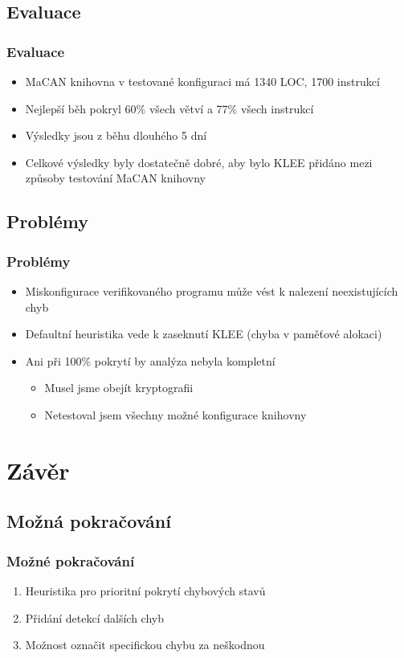 \documentclass{beamer}
\begin{document}
\subsection*{Evaluace}
\begin{frame}
\frametitle{Evaluace}
\begin{itemize}
    \item MaCAN knihovna v testované konfiguraci má 1340 LOC, 1700 instrukcí
    \item Nejlepší běh pokryl 60\% všech větví a 77\% všech instrukcí
    \item Výsledky jsou z běhu dlouhého 5 dní
    \item Celkové výsledky byly dostatečně dobré, aby bylo KLEE přidáno mezi
    způsoby testování MaCAN knihovny
\end{itemize}
\end{frame}

\subsection*{Problémy}
\begin{frame}
\frametitle{Problémy}
\begin{itemize}
    \item Miskonfigurace verifikovaného programu může vést k nalezení neexistujících chyb
    \item Defaultní heuristika vede k zaseknutí KLEE (chyba v paměťové alokaci)
    \item Ani při 100\% pokrytí by analýza nebyla kompletní
    \begin{itemize}
        \item Musel jsme obejít kryptografii
        \item Netestoval jsem všechny možné konfigurace knihovny
    \end{itemize}
\end{itemize}
\end{frame}


\section{Závěr}
\subsection*{Možná pokračování}
\begin{frame}
\frametitle{Možné pokračování}
\begin{enumerate}
    \item Heuristika pro prioritní pokrytí chybových stavů
    \item Přidání detekcí dalších chyb
    \item Možnost označit specifickou chybu za neškodnou
\end{enumerate}
\end{frame}
\end{document}
